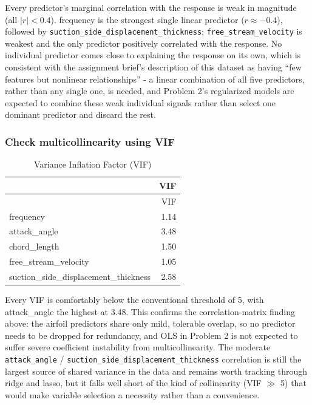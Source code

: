 \documentclass[
  11pt,
]{article}
\begin{document}
Every predictor's marginal correlation with the response is weak in
magnitude (all \(|r| < 0.4\)). frequency is the strongest single linear
predictor (\(r \approx -0.4\)), followed by
\texttt{suction\_side\_displacement\_thickness};
\texttt{free\_stream\_velocity} is weakest and the only predictor
positively correlated with the response. No individual predictor comes
close to explaining the response on its own, which is consistent with
the assignment brief's description of this dataset as having ``few
features but nonlinear relationships'' - a linear combination of all
five predictors, rather than any single one, is needed, and Problem 2's
regularized models are expected to combine these weak individual signals
rather than select one dominant predictor and discard the rest.

\subsubsection{Check multicollinearity using
VIF}\label{check-multicollinearity-using-vif}

\begin{longtable}[]{@{}lr@{}}
\caption{Variance Inflation Factor (VIF)}\tabularnewline
\toprule\noalign{}
& VIF \\
\midrule\noalign{}
\endfirsthead
\toprule\noalign{}
& VIF \\
\midrule\noalign{}
\endhead
\bottomrule\noalign{}
\endlastfoot
frequency & 1.14 \\
attack\_angle & 3.48 \\
chord\_length & 1.50 \\
free\_stream\_velocity & 1.05 \\
suction\_side\_displacement\_thickness & 2.58 \\
\end{longtable}

Every VIF is comfortably below the conventional threshold of 5, with
attack\_angle the highest at 3.48. This confirms the correlation-matrix
finding above: the airfoil predictors share only mild, tolerable
overlap, so no predictor needs to be dropped for redundancy, and OLS in
Problem 2 is not expected to suffer severe coefficient instability from
multicollinearity. The moderate \texttt{attack\_angle} /
\texttt{suction\_side\_displacement\_thickness} correlation is still the
largest source of shared variance in the data and remains worth tracking
through ridge and lasso, but it falls well short of the kind of
collinearity (VIF \(\gg\) 5) that would make variable selection a
necessity rather than a convenience.
\end{document}
